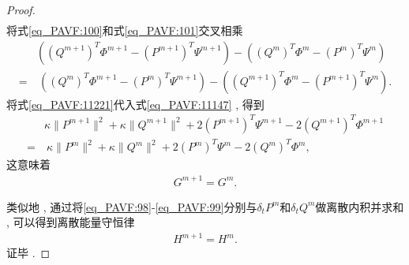\begin{proof}
\begin{align}
\end{align}
将式\eqref{eq_PAVF:100}和式\eqref{eq_PAVF:101}交叉相乘
\begin{align}\label{eq_PAVF:11221}
&((Q^{m+1})^{T}\varPhi^{m+1}-(P^{m+1})^{T}\Psi^{m+1})-((Q^{m})^{T}\varPhi^{m}-(P^{m})^{T}\Psi^{m})\nonumber\\
=&~((Q^{m})^{T}\varPhi^{m+1}-(P^{m})^{T}\Psi^{m+1})-((Q^{m+1})^{T}\varPhi^{m}-(P^{m+1})^{T}\Psi^{m}) . 
\end{align}
将式\eqref{eq_PAVF:11221}代入式\eqref{eq_PAVF:11147} , 得到
\begin{align}
&\kappa \|P^{m+1}\|^2+\kappa \|Q^{m+1}\|^2+2(P^{m+1})^{T}\Psi^{m+1}-2(Q^{m+1})^{T}\varPhi^{m+1}\nonumber
\\=&~\kappa \|P^{m}\|^2+\kappa \|Q^{m}\|^2+2(P^{m})^{T}\Psi^{m}-2(Q^{m})^{T}\varPhi^{m} , \label{eq_PAVF:11155}
\end{align}
这意味着
\begin{align}\label{eq_PAVF:11149}
G^{m+1}=G^{m}  . 
\end{align}

类似地 , 通过将\eqref{eq_PAVF:98}-\eqref{eq_PAVF:99}分别与$\delta_t P^{m}$和$\delta_t Q^{m}$做离散内积并求和 , 可以得到离散能量守恒律
\begin{align}\label{eq_PAVF:11156}
H^{m+1}=H^{m} . 
\end{align}
证毕 . 
\end{proof}

